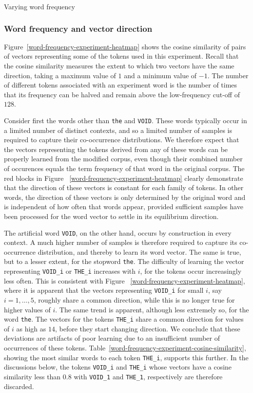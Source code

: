 \documentclass{article} %
\newcommand{\word}[1]{\texttt{#1}}
\begin{document}
\begin{section}{Varying word frequency}
\subsubsection{Word frequency and vector direction}\label{WFVE-direction}
%
Figure~\ref{word-frequency-experiment-heatmap} shows the cosine
similarity of pairs of vectors representing some of the tokens used in
this experiment.  Recall that the cosine similarity measures the extent
to which two vectors have the same direction, taking a maximum value of
$1$ and a minimum value of $-1$.  The number of different tokens
associated with an experiment word is the number of times that its
frequency can be halved and remain above the low-frequency cut-off of
$128$.

Consider first the words other than \word{the} and \word{VOID}.  These
words typically occur in a limited number of distinct contexts, and
so a limited number of samples is required to capture their
co-occurrence distributions.  We therefore expect that the vectors
representing the tokens derived from any of these words can be properly
learned from the modified corpus, even though their combined number of
occurences equals the term frequency of that word in the original
corpus.  The red blocks in Figure ~\ref{word-frequency-experiment-heatmap}
clearly demonstrate that the direction of these vectors is constant for
each family of tokens.  In other words, the direction of these vectors
is only determined by the original word and is independent of how often
that words appear, provided sufficient samples have been processed for
the word vector to settle in its equilibrium direction.

The artificial word \word{VOID}, on the other hand, occurs by
construction in every context.  A much higher number of samples is
therefore required to capture its co-occurrence distribution, and
thereby to learn its word vector.  The same is true, but to a lesser
extent, for the stopword \word{the}.  The difficulty of learning the
vector representing \word{VOID\_i} or \word{THE\_i} increases with $i$,
for the tokens occur increasingly less often.  This is consistent with
Figure ~\ref{word-frequency-experiment-heatmap}, where it is apparent that
the vectors representing \word{VOID\_i} for small $i$, say $i = 1,
\dots, 5$, roughly share a common direction, while this is no longer
true for higher values of $i$.  The same trend is apparent, although
less extremely so, for the word \word{the}.  The vectors for the tokens
\word{THE\_i} share a common direction for values of $i$ as high as
$14$, before they start changing direction.  We conclude that these
deviations are artifacts of poor learning due to an insufficient number
of occurrences of these tokens.
Table~\ref{word-frequency-experiment-cosine-similarity}, showing the
most similar words to each token \word{THE\_i}, supports this further.  In the
discussions below, the tokens \word{VOID\_i} and
\word{THE\_i} whose vectors have a cosine similarity less than $0.8$
with \word{VOID\_1} and \word{THE\_1}, respectively are therefore
discarded.


\end{section}
\end{document}
